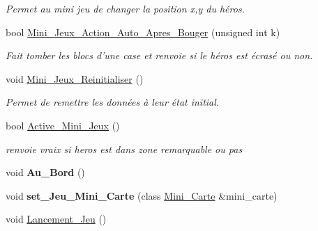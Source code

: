 \begin{DoxyCompactItemize}
\begin{DoxyCompactList}\small\item\em Permet au mini jeu de changer la position x,y du héros. \end{DoxyCompactList}\item 
\hypertarget{classJeu_aed47180f476f4d6d3271c184314eb79d}{bool \hyperlink{classJeu_aed47180f476f4d6d3271c184314eb79d}{Mini\+\_\+\+Jeux\+\_\+\+Action\+\_\+\+Auto\+\_\+\+Apres\+\_\+\+Bouger} (unsigned int k)}\label{classJeu_aed47180f476f4d6d3271c184314eb79d}

\begin{DoxyCompactList}\small\item\em Fait tomber les blocs d'une case et renvoie si le héros est écrasé ou non. \end{DoxyCompactList}\item 
\hypertarget{classJeu_aa0169feb94e7da99623bcf75d7eeef68}{void \hyperlink{classJeu_aa0169feb94e7da99623bcf75d7eeef68}{Mini\+\_\+\+Jeux\+\_\+\+Reinitialiser} ()}\label{classJeu_aa0169feb94e7da99623bcf75d7eeef68}

\begin{DoxyCompactList}\small\item\em Permet de remettre les données à leur état initial. \end{DoxyCompactList}\item 
\hypertarget{classJeu_a96aa5729378ab7b3a7974ef20da46043}{bool \hyperlink{classJeu_a96aa5729378ab7b3a7974ef20da46043}{Active\+\_\+\+Mini\+\_\+\+Jeux} ()}\label{classJeu_a96aa5729378ab7b3a7974ef20da46043}

\begin{DoxyCompactList}\small\item\em renvoie vraix si heros est dans zone remarquable ou pas \end{DoxyCompactList}\item 
\hypertarget{classJeu_a6a502f030e41b28604e5ffcd98e3ddd6}{void {\bfseries Au\+\_\+\+Bord} ()}\label{classJeu_a6a502f030e41b28604e5ffcd98e3ddd6}

\item 
\hypertarget{classJeu_a09ddc111dfdc9ec4531e32c0a63c0a05}{void {\bfseries set\+\_\+\+Jeu\+\_\+\+Mini\+\_\+\+Carte} (class \hyperlink{classMini__Carte}{Mini\+\_\+\+Carte} \&mini\+\_\+carte)}\label{classJeu_a09ddc111dfdc9ec4531e32c0a63c0a05}

\item 
\hypertarget{classJeu_a1fd894fb3e7ac370f8e3c0c3bc02fd49}{void \hyperlink{classJeu_a1fd894fb3e7ac370f8e3c0c3bc02fd49}{Lancement\+\_\+\+Jeu} ()}\label{classJeu_a1fd894fb3e7ac370f8e3c0c3bc02fd49}


\end{DoxyCompactItemize}
